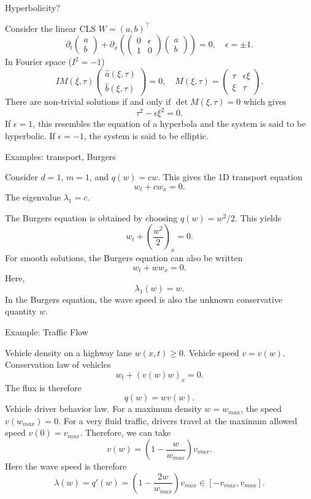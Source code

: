 \documentclass[english]{beamer}
\begin{document}
\begin{frame}{Hyperbolicity?}

Consider the linear CLS $W=(a,b)^{\intercal}$
\[
\partial_{t}\left(\begin{array}{c}
a\\
b
\end{array}\right)+\partial_{x}\left(\left(\begin{array}{cc}
0 & \epsilon\\
1 & 0
\end{array}\right)\left(\begin{array}{c}
a\\
b
\end{array}\right)\right)=0,\quad\epsilon=\pm1.
\]
In Fourier space ($I^2=-1$)
\[
IM(\xi,\tau)\left(\begin{array}{c}
\hat{a}(\xi,\tau)\\
\hat{b}(\xi,\tau)
\end{array}\right)=0,\quad M(\xi,\tau)=\left(\begin{array}{cc}
\tau & \epsilon\xi\\
\xi & \tau
\end{array}\right).
\]
There are non-trivial solutions if and only if $\det M(\xi,\tau)=0$ which gives
\[
\tau{{}^2}-\epsilon\xi^{2}=0.
\]
If $\epsilon=1$, this resembles the equation of a hyperbola and the system is said to be hyperbolic. If $\epsilon=-1$, the system is said to be elliptic.
\end{frame}
%
\begin{frame}{Examples: transport, Burgers}

Consider $d=1$, $m=1$, and $q(w)=cw$. This gives the 1D transport equation
\[
w_{t}+cw_{x}=0.
\]
The eigenvalue $\lambda_{1}=c$.

The Burgers equation is obtained by choosing $q(w)=w^{2}/2$. This yields
\[
w_{t}+\left(\frac{w^{2}}{2}\right)_{x}=0.
\]
For smooth solutions, the Burgers equation can also be written
\[
w_{t}+ww_{x}=0.
\]
Here, 
\[
\lambda_{1}(w)=w.
\]
In the Burgers equation, the wave speed is also the unknown conservative quantity $w$.
\end{frame}
%

\begin{frame}{Example: Traffic Flow}

Vehicle density on a highway lane $w(x,t)\geq0$. Vehicle speed $v=v(w)$. Conservation law of vehicles
\[
w_{t}+(v(w)w)_{x}=0.
\]
The flux is therefore
\[
q(w)=wv(w).
\]
Vehicle driver behavior law. For a maximum density $w=w_{
m ax}$, the speed $v(w_{
m ax})=0$. For a very fluid traffic, drivers travel at the maximum allowed speed $v(0)=v_{
m ax}$. Therefore, we can take
\[
v(w)=(1-\frac{w}{w_{
m ax}})v_{
m ax}.
\]
Here the wave speed is therefore
\[
\lambda(w)=q'(w)=(1-\frac{2w}{w_{
m ax}})v_{
m ax}\in\left[-v_{
m ax},v_{
m ax}\right].
\]

\end{frame}
\end{document}
